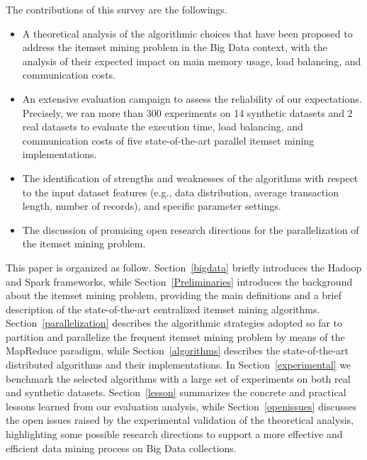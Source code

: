 The contributions of this survey are the followings. 

\begin{itemize}
\item A theoretical analysis of the algorithmic choices that have been proposed to address the itemset mining problem 
in the Big Data context, with the analysis of their expected impact on main memory usage, load balancing, and communication costs. 

\item An extensive evaluation campaign to assess the reliability of our expectations.
Precisely, we ran more than 300 experiments on 14 synthetic datasets and 2 real datasets to evaluate the execution time, load balancing, and communication costs
of five state-of-the-art parallel itemset mining implementations. 

\item The identification of strengths and weaknesses of the algorithms 
with respect to 
the input dataset features (e.g., data distribution, average  transaction length, number of records), 
and specific parameter settings. 

\item The discussion of promising open research directions for the parallelization of the itemset mining problem.

\end{itemize}

This paper is organized as follow. Section~\ref{bigdata} briefly introduces the
Hadoop and Spark frameworks,  while Section~\ref{Preliminaries} introduces the
background about the itemset mining problem, providing the main definitions and a brief description of the state-of-the-art centralized itemset mining algorithms. 
Section~\ref{parallelization} describes the algorithmic strategies adopted so far to partition and parallelize the frequent itemset mining problem by means of the MapReduce paradigm, while 
Section~\ref{algorithms} describes the state-of-the-art distributed algorithms and their implementations.
In Section~\ref{experimental} we benchmark the selected algorithms with a large set of experiments on both real and synthetic datasets.
Section~\ref{lesson} summarizes the concrete and practical lessons learned from our evaluation analysis, while Section~\ref{openissues} discusses the open issues raised by the experimental validation of the theoretical analysis, highlighting some possible research directions to support a more effective and efficient data mining process on Big Data collections. 

